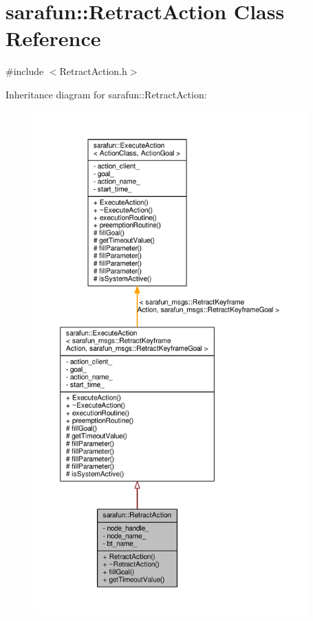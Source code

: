 \hypertarget{classsarafun_1_1RetractAction}{\section{sarafun\-:\-:Retract\-Action Class Reference}
\label{classsarafun_1_1RetractAction}
}


{\ttfamily \#include $<$Retract\-Action.\-h$>$}



Inheritance diagram for sarafun\-:\-:Retract\-Action\-:\nopagebreak
\begin{figure}[H]
\begin{center}
\leavevmode
\includegraphics[height=550pt]{d6/d3a/classsarafun_1_1RetractAction__inherit__graph}
\end{center}
\end{figure}


